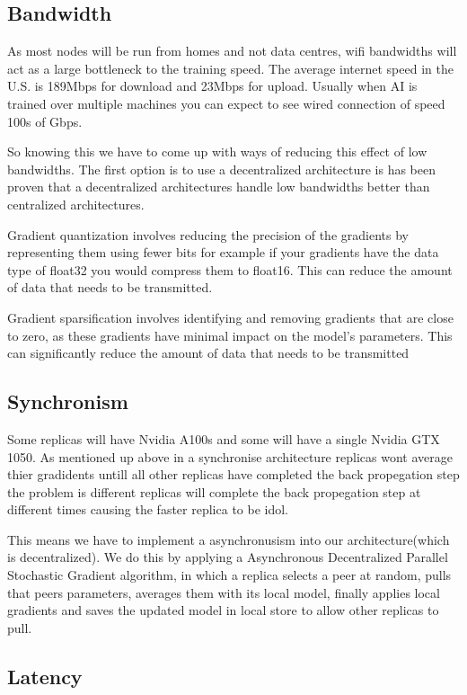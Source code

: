 \documentclass[11pt]{article}
\begin{document}
\subsection{Bandwidth}
As most nodes will be run from homes and not data centres, wifi bandwidths will act as a large bottleneck to the training speed. The average internet speed in the U.S. is 189Mbps for download and 23Mbps for upload. Usually when AI is trained over multiple machines you can expect to see wired connection of speed 100s of Gbps.

So knowing this we have to come up with ways of reducing this effect of low bandwidths. The first option is to use a decentralized architecture is has been proven that a decentralized architectures handle low bandwidths better than centralized architectures. 

Gradient quantization involves reducing the precision of the gradients by representing them using fewer bits for example if your gradients have the data type of float32 you would compress them to float16. This can reduce the amount of data that needs to be transmitted.

Gradient sparsification involves identifying and removing gradients that are close to zero, as these gradients have minimal impact on the model's parameters. This can significantly reduce the amount of data that needs to be transmitted

\subsection{Synchronism}

Some replicas will have Nvidia A100s and some will have a single Nvidia GTX 1050. As mentioned up above in a synchronise architecture replicas wont average thier gradidents untill all other replicas have completed the back propegation step the problem is different replicas will complete the back propegation step at different times causing the faster replica to be idol.

This means we have to implement a asynchronusism into our architecture(which is decentralized). We do this by applying a Asynchronous Decentralized Parallel Stochastic Gradient algorithm, in which a replica selects a peer at random, pulls that peers parameters, averages them with its local model, finally applies local gradients and saves the updated model in local store to allow other replicas to pull.



\subsection{Latency}



\end{document}
